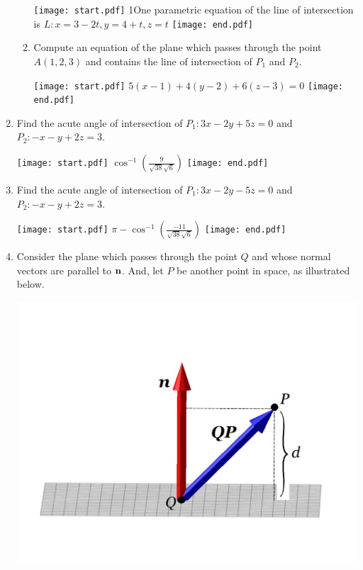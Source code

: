 \documentclass[12pt]{article}
\begin{document}
\begin{enumerate}
\begin{enumerate}
\texttt{[image: start.pdf]}
{{{1\linewidth}{One parametric equation of the line of intersection is $L: x=3-2t, y=4+t, z=t$}}}
\texttt{[image: end.pdf]}


\item Compute an equation of the plane which passes through the point $A(1,2,3)$ and contains the line of intersection of $P_1$ and $P_2$.

\texttt{[image: start.pdf]}
{{$5(x-1)+4(y-2)+6(z-3)=0$}}
\texttt{[image: end.pdf]}


\end{enumerate}

\item Find the acute angle of intersection of $P_1: 3x-2y+5z=0$ and $P_2: -x-y+2z=3$.

\texttt{[image: start.pdf]}
{{$\cos^{-1}\left(\frac{9}{\sqrt{38}\sqrt{6}}\right)$}}
\texttt{[image: end.pdf]}


\item Find the acute angle of intersection of $P_1: 3x-2y-5z=0$ and $P_2: -x-y+2z=3$.

\texttt{[image: start.pdf]}
{{$\pi-\cos^{-1}\left(\frac{-11}{\sqrt{38}\sqrt{6}}\right)$}}
\texttt{[image: end.pdf]}


\item Consider the plane which passes through the point $Q$ and whose normal vectors are parallel to ${\bf n}$.  And, let $P$ be another point in space, as illustrated below.

\begin{center}
\includegraphics[scale=0.5]{distance.pdf}
\end{center}


\end{enumerate}
\end{document}

